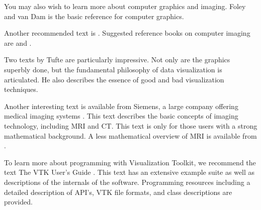 You may also wish to learn more about computer graphics and imaging. Foley and van Dam \cite{FoleyVanDam90} is the basic reference for computer graphics. 

Another recommended text is \cite{BurgerGillies89}. Suggested reference books on computer imaging are \cite{Pavlidis82} and \cite{Wolberg90}.

Two texts by Tufte \cite{Tufte83} \cite{Tufte90} are particularly impressive. Not only are the graphics superbly done, but the fundamental philosophy of data visualization is articulated. He also describes the essence of good and bad visualization techniques.

Another interesting text is available from Siemens, a large company offering medical imaging systems \cite{Krestel90}. This text describes the basic concepts of imaging technology, including MRI and CT. This text is only for those users with a strong mathematical background. A less mathematical
overview of MRI is available from \cite{SmithRanallo89}.

To learn more about programming with Visualization Toolkit, we recommend the text The VTK User's Guide \cite{UsersGuide}. This text has an extensive example suite as well as descriptions of the internals of the software. Programming resources including a detailed description of API's, VTK file formats, and class descriptions are provided.

\printbibliography
